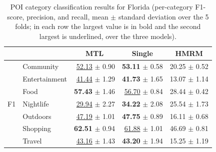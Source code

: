 \begin{table}[htbp]
\caption{POI category classification results for Florida (per-category F1-score, precision, and recall, mean $\pm$ standard deviation over the 5 folds; in each row the largest value is in bold and the second largest is underlined, over the three models).}
\label{tab:cbic:category}
\centering
\begin{tabular}{llrrr}
\toprule
 & & \multicolumn{1}{c}{\textbf{MTL}} & \multicolumn{1}{c}{\textbf{Single}} & \multicolumn{1}{c}{\textbf{HMRM}} \\
\midrule
\multirow{7}{*}{F1}        & Community     & \underline{52.13} $\pm$ 0.90          & \textbf{53.11} $\pm$ 0.58 & 20.25 $\pm$ 0.52 \\
                           & Entertainment & \underline{41.44} $\pm$ 1.29          & \textbf{41.73} $\pm$ 1.65 & 13.07 $\pm$ 1.14 \\
                           & Food          & \textbf{57.43} $\pm$ 1.46 & \underline{56.70} $\pm$ 0.84          & 28.44 $\pm$ 0.42 \\
                           & Nightlife     & \underline{29.94} $\pm$ 2.27          & \textbf{34.22} $\pm$ 2.08 & 25.54 $\pm$ 1.73 \\
                           & Outdoors      & \underline{47.19} $\pm$ 1.01          & \textbf{47.75} $\pm$ 0.89 & 16.11 $\pm$ 0.68 \\
                           & Shopping      & \textbf{62.51} $\pm$ 0.94 & \underline{61.88} $\pm$ 1.01          & 46.69 $\pm$ 0.81 \\
                           & Travel        & \underline{43.16} $\pm$ 1.43          & \textbf{43.20} $\pm$ 1.94 & 15.25 $\pm$ 1.19 \\

\end{tabular}
\end{table}
